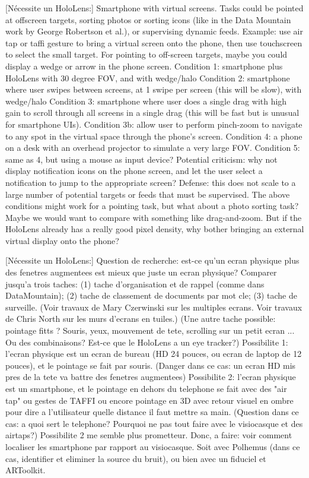 [Nécessite un HoloLens:]
Smartphone with virtual screens.
Tasks could be pointed at offscreen targets, sorting photos or sorting icons (like in the Data Mountain work by George Robertson et al.), or supervising dynamic feeds.
Example: use air tap or taffi gesture to bring a virtual screen onto the phone, then use touchscreen to select the small target.
For pointing to off-screen targets, maybe you could display a wedge or arrow in the phone screen.
Condition 1: smartphone plus HoloLens with 30 degree FOV, and with wedge/halo
Condition 2: smartphone where user swipes between screens, at 1 swipe per screen (this will be slow), with wedge/halo
Condition 3: smartphone where user does a single drag with high gain to scroll through all screens in a single drag (this will be fast but is unusual for smartphone UIs).
Condition 3b: allow user to perform pinch-zoom to navigate to any spot in the virtual space through the phone's screen.
Condition 4: a phone on a desk with an overhead projector to simulate a very large FOV.
Condition 5: same as 4, but using a mouse as input device?
Potential criticism: why not display notification icons on the phone screen, and let the user select a notification to jump to the appropriate screen? Defense: this does not scale to a large number of potential targets or feeds that must be supervised.
The above conditions might work for a pointing task, but what about a photo sorting task?  Maybe we would want to compare with something like drag-and-zoom.
But if the HoloLens already has a really good pixel density, why bother bringing an external virtual display onto the phone?
 
 
 
[Nécessite un HoloLens:]
Question de recherche: est-ce qu'un ecran physique plus des fenetres augmentees est mieux que juste un ecran physique?
Comparer jusqu'a trois taches: (1) tache d'organisation et de rappel (comme dans DataMountain); (2) tache de classement de documents par mot cle; (3) tache de surveille.
(Voir travaux de Mary Czerwinski sur les multiples ecrans. Voir travaux de Chris North sur les murs d'ecrans en tuiles.)
(Une autre tache possible: pointage fitts ? Souris, yeux, mouvement de tete, scrolling sur un petit ecran ... Ou des combinaisons? Est-ce que le HoloLens a un eye tracker?)
Possibilite 1: l'ecran physique est un ecran de bureau (HD 24 pouces, ou ecran de laptop de 12 pouces), et le pointage se fait par souris.  (Danger dans ce cas: un ecran HD mis pres de la tete va battre des fenetres augmentees)
Possibilite 2: l'ecran physique est un smartphone, et le pointage en dehors du telephone se fait avec des "air tap" ou gestes de TAFFI ou encore pointage en 3D avec retour visuel en ombre pour dire a l'utilisateur quelle distance il faut mettre sa main. (Question dans ce cas: a quoi sert le telephone?  Pourquoi ne pas tout faire avec le visiocasque et des airtaps?)
Possibilite 2 me semble plus prometteur.  Donc, a faire: voir comment localiser les smartphone par rapport au visiocasque. Soit avec Polhemus (dans ce cas, identifier et eliminer la source du bruit), ou bien avec un fiduciel et ARToolkit.
 
